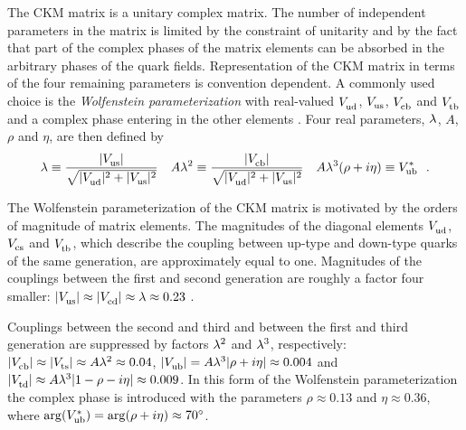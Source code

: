 The CKM matrix is a unitary complex matrix. The number of independent parameters in the matrix is limited by the constraint of unitarity
and by the fact that part of the complex phases of the matrix elements can be absorbed in the arbitrary phases of the quark fields.
Representation of the CKM matrix in terms of the four remaining parameters is convention dependent. A commonly used choice is the
\emph{Wolfenstein parameterization} with real-valued $\Vud$, $\Vus$, $\Vcb$ and $\Vtb$ and a complex phase entering in the other elements
\cite{Wolfenstein:1983yz,*Chau:1984fp,*Buras:1994ec}. Four real parameters, $\lam$, $A$, $\rho$ and $\eta$, are then
defined by
\begin{equation}
  \begin{gathered}
    \lam \equiv \frac{|\Vus|}{\sqrt{|\Vud|^2 + |\Vus|^2}}
      \quad
      A\lam^2 \equiv \frac{|\Vcb|}{\sqrt{|\Vud|^2 + |\Vus|^2}}
      \quad
      A\lam^3(\rho+i\eta) \equiv \Vub[*]
      \ \ .
  \end{gathered}
\end{equation}

The Wolfenstein parameterization of the CKM matrix is motivated by the orders of magnitude of matrix elements. The magnitudes of the
diagonal elements $\Vud$, $\Vcs$ and $\Vtb$, which describe the coupling between up-type and down-type quarks of the same generation, are
approximately equal to one. Magnitudes of the couplings between the first and second generation are roughly a factor four smaller:
$|\Vus|\approx|\Vcd|\approx\lam\approx0.23$ \cite{Charles:2004jd,Bona:2005vz}.

Couplings between the second and third and between the first and third generation are suppressed by factors $\lam^2$ and $\lam^3$,
respectively: $|\Vcb|\approx|\Vts|\approx A\lam^2\approx0.04$, $|\Vub|=A\lam^3|\rho+i\eta|\approx0.004$ and $|\Vtd|\approx
A\lam^3|1-\rho-i\eta|\approx0.009$. In this form of the Wolfenstein parameterization the complex phase is introduced with the parameters
$\rho\approx0.13$ and $\eta\approx0.36$, where $\arg(\Vub[*])=\arg(\rho+i\eta)\approx70^\circ$.

